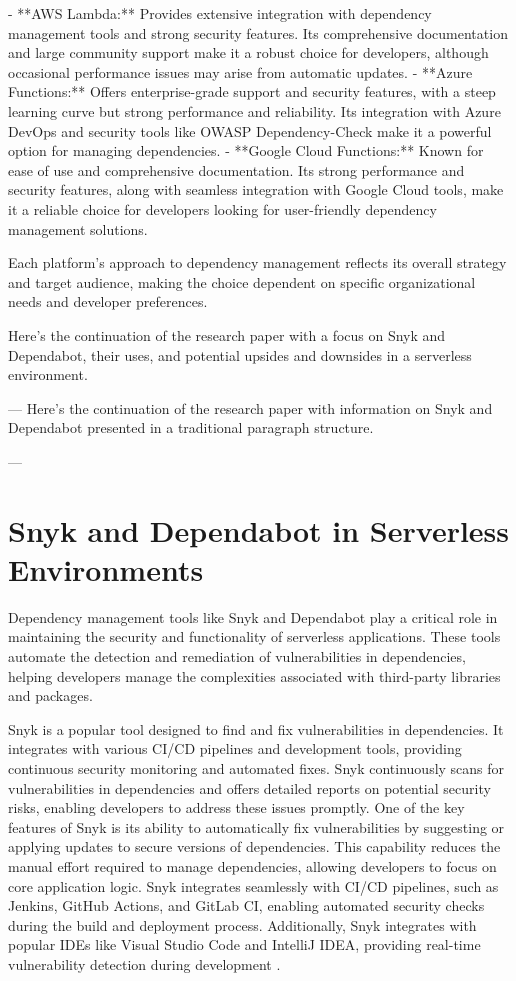 \documentclass[sigconf]{acmart}
\begin{document}
- **AWS Lambda:** Provides extensive integration with dependency management tools and strong security features. Its comprehensive documentation and large community support make it a robust choice for developers, although occasional performance issues may arise from automatic updates.
- **Azure Functions:** Offers enterprise-grade support and security features, with a steep learning curve but strong performance and reliability. Its integration with Azure DevOps and security tools like OWASP Dependency-Check make it a powerful option for managing dependencies.
- **Google Cloud Functions:** Known for ease of use and comprehensive documentation. Its strong performance and security features, along with seamless integration with Google Cloud tools, make it a reliable choice for developers looking for user-friendly dependency management solutions.

Each platform's approach to dependency management reflects its overall strategy and target audience, making the choice dependent on specific organizational needs and developer preferences.


Here's the continuation of the research paper with a focus on Snyk and Dependabot, their uses, and potential upsides and downsides in a serverless environment.

---
Here's the continuation of the research paper with information on Snyk and Dependabot presented in a traditional paragraph structure.

---

\section{Snyk and Dependabot in Serverless Environments}

Dependency management tools like Snyk and Dependabot play a critical role in maintaining the security and functionality of serverless applications. These tools automate the detection and remediation of vulnerabilities in dependencies, helping developers manage the complexities associated with third-party libraries and packages.

Snyk is a popular tool designed to find and fix vulnerabilities in dependencies. It integrates with various CI/CD pipelines and development tools, providing continuous security monitoring and automated fixes. Snyk continuously scans for vulnerabilities in dependencies and offers detailed reports on potential security risks, enabling developers to address these issues promptly. One of the key features of Snyk is its ability to automatically fix vulnerabilities by suggesting or applying updates to secure versions of dependencies. This capability reduces the manual effort required to manage dependencies, allowing developers to focus on core application logic. Snyk integrates seamlessly with CI/CD pipelines, such as Jenkins, GitHub Actions, and GitLab CI, enabling automated security checks during the build and deployment process. Additionally, Snyk integrates with popular IDEs like Visual Studio Code and IntelliJ IDEA, providing real-time vulnerability detection during development \cite{snyk2023, snykIDE2023}.
\end{document}

